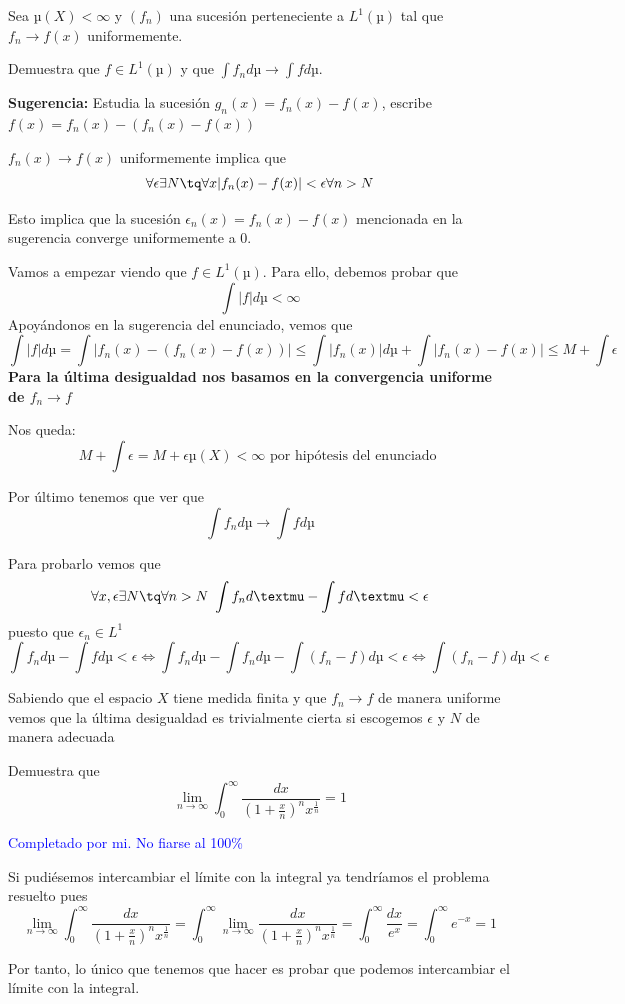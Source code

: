 \begin{problem}[17]
Sea $µ(X)<\infty$ y $(f_n)$ una sucesión perteneciente a $L^1(µ)$ tal que $f_n\rightarrow f(x)$ uniformemente.

Demuestra que $f\in L^1(µ)$ y que $\int f_n dµ \rightarrow \int f dµ$.

\textbf{Sugerencia:} Estudia la sucesión $g_n(x)=f_n(x)-f(x)$, escribe $f(x)=f_n(x)-(f_n(x)-f(x))$

\solution

$f_n(x) \to f(x)$ uniformemente implica que
\[\forall \epsilon \exists N \tq \forall x |f_n(x)-f(x)|< \epsilon \forall n > N\]

Esto implica que la sucesión $\epsilon_n(x)=f_n(x)-f(x)$ mencionada en la sugerencia converge uniformemente a 0.

Vamos a empezar viendo que $f\in L^1(µ)$. Para ello, debemos probar que
\[\int |f|dµ < \infty\]
Apoyándonos en la sugerencia del enunciado, vemos que
\[\int |f|dµ = \int |f_n(x)-(f_n(x)-f(x))| \leq \int |f_n(x)|dµ +\int |f_n(x)-f(x)| \leq M + \int \epsilon\]
\textbf{Para la última desigualdad nos basamos en la convergencia uniforme de $f_n \to f$}

Nos queda:
\[M + \int \epsilon = M + \epsilon µ(X) < \infty \text{ por hipótesis del enunciado }\]

Por último tenemos que ver que
\[\int f_n dµ \to \int f dµ\]

Para probarlo vemos que
\[\forall x, \epsilon \exists N \tq \forall n > N \ \int f_n dµ - \int f dµ < \epsilon\]
puesto que $\epsilon_n \in L^1$
\[\int f_n dµ - \int f dµ < \epsilon \iff \int f_n dµ - \int f_n dµ - \int (f_n-f)dµ < \epsilon \iff  \int (f_n-f)dµ < \epsilon\]

Sabiendo que el espacio $X$ tiene medida finita y que $f_n \to f$ de manera uniforme vemos que la última desigualdad es trivialmente cierta si escogemos $\epsilon$ y $N$ de manera adecuada

\end{problem}


\begin{problem}[18]
Demuestra que
\[\lim_{n\to\infty}\int_0^{\infty}\frac{dx}{(1+\frac{x}{n})^n x^{\frac{1}{n}}} = 1\]

\solution
\textcolor{blue}{Completado por mi. No fiarse al 100\%}

Si pudiésemos intercambiar el límite con la integral ya tendríamos el problema resuelto pues
\[\lim_{n\to\infty}\int_0^{\infty}\frac{dx}{(1+\frac{x}{n})^n x^{\frac{1}{n}}} = \int_0^{\infty}\lim_{n\to\infty}\frac{dx}{(1+\frac{x}{n})^n x^{\frac{1}{n}}}=\int_0^{\infty}\frac{dx}{e^x}=\int_0^{\infty}e^{-x}=1\]

Por tanto, lo único que tenemos que hacer es probar que podemos intercambiar el límite con la integral.
\end{problem}

